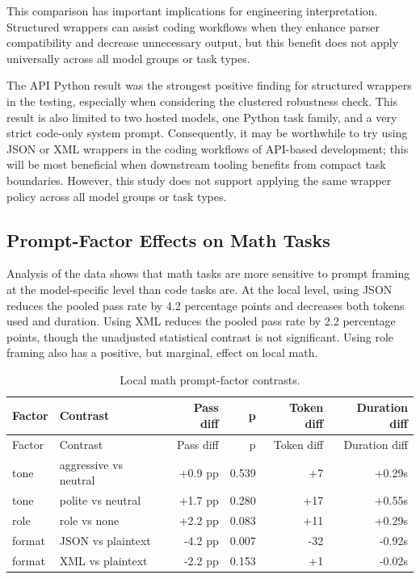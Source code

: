 \documentclass{llncs}
\begin{document}
This comparison has important implications for engineering interpretation. Structured wrappers can assist coding workflows when they enhance parser compatibility and decrease unnecessary output, but this benefit does not apply universally across all model groups or task types.

The API Python result was the strongest positive finding for structured wrappers in the testing, especially when considering the clustered robustness check. This result is also limited to two hosted models, one Python task family, and a very strict code-only system prompt. Consequently, it may be worthwhile to try using JSON or XML wrappers in the coding workflows of API-based development; this will be most beneficial when downstream tooling benefits from compact task boundaries. However, this study does not support applying the same wrapper policy across all model groups or task types.

\subsection{Prompt-Factor Effects on Math Tasks}\label{prompt-factor-effects-on-math-tasks}

Analysis of the data shows that math tasks are more sensitive to prompt framing at the model-specific level than code tasks are. At the local level, using JSON reduces the pooled pass rate by 4.2 percentage points and decreases both tokens used and duration. Using XML reduces the pooled pass rate by 2.2 percentage points, though the unadjusted statistical contrast is not significant. Using role framing also has a positive, but marginal, effect on local math.

\begin{longtable}[]{@{}llrrrr@{}}
\caption{Local math prompt-factor contrasts.}\tabularnewline
\toprule\noalign{}
Factor & Contrast & Pass diff & p & Token diff & Duration diff \\
\midrule\noalign{}
\endfirsthead
\toprule\noalign{}
Factor & Contrast & Pass diff & p & Token diff & Duration diff \\
\midrule\noalign{}
\endhead
\bottomrule\noalign{}
\endlastfoot
tone & aggressive vs neutral & +0.9 pp & 0.539 & +7 & +0.29s \\
tone & polite vs neutral & +1.7 pp & 0.280 & +17 & +0.55s \\
role & role vs none & +2.2 pp & 0.083 & +11 & +0.29s \\
format & JSON vs plaintext & -4.2 pp & 0.007 & -32 & -0.92s \\
format & XML vs plaintext & -2.2 pp & 0.153 & +1 & -0.02s \\
\end{longtable}
\end{document}
